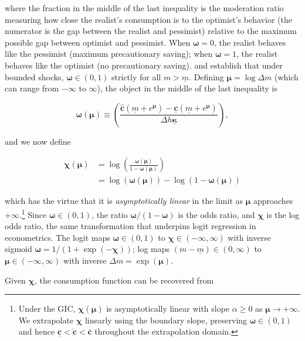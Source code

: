 \documentclass[preprint,authoryear]{elsarticle}
\newcommand{\mNrm}{m}
\newcommand{\hNrm}{h}
\newcommand{\cFunc}{\mathbf{c}}
\newcommand{\cFuncOpt}{\bar{\cFunc}}
\newcommand{\MPC}{\boldsymbol{\kappa}}
\newcommand{\MPCmin}{\underline{\MPC}}
\newcommand{\cFuncPes}{\underline{\cFunc}}
\newcommand{\mNrmMin}{\underline{\mNrm}}
\newcommand{\mNrmEx}{\Delta \mNrm}
\newcommand{\hNrmEx}{\Delta \hNrm}
\newcommand{\cFuncReal}{\hat{\cFunc}}
\newcommand{\modRte}{\boldsymbol{\omega}}
\newcommand{\logmNrmEx}{\boldsymbol{\mu}}
\newcommand{\logitModRte}{\boldsymbol{\chi}}
\newcommand{\asympSlope}{\alpha}
\newcommand{\cFuncApprox}{\grave{\cFunc}}
\begin{document}
where the fraction in the middle of the last inequality is the moderation ratio measuring how close the realist's consumption is to the optimist's behavior (the numerator is the gap between the realist and pessimist) relative to the maximum possible gap between optimist and pessimist. When $\modRte=0$, the realist behaves like the pessimist (maximum precautionary saving); when $\modRte=1$, the realist behaves like the optimist (no precautionary saving). \citet{CarrollKimball1996} and \citet{CarrollShanker2024} establish that under bounded shocks, $\modRte\in(0,1)$ strictly for all $\mNrm > \mNrmMin$. Defining $\logmNrmEx = \log \mNrmEx$ (which can range from $-\infty$ to $\infty$), the object in the middle of the last inequality is

\begin{equation}
\label{eq:modRte}
\modRte(\logmNrmEx) \equiv  \left(\frac{\cFuncReal(\mNrmMin+e^{\logmNrmEx})-\cFuncPes(\mNrmMin+e^{\logmNrmEx})}{\hNrmEx \MPCmin}\right),
\end{equation}

and we now define

\begin{equation}
\label{eq:chi}
\begin{aligned}
\logitModRte(\logmNrmEx) &= \log \left(\frac{\modRte(\logmNrmEx)}{1-\modRte(\logmNrmEx)}\right) \\
&= \log(\modRte(\logmNrmEx)) - \log(1-\modRte(\logmNrmEx))
\end{aligned}
\end{equation}

which has the virtue that it is \textit{asymptotically linear} in the limit as $\logmNrmEx$ approaches $+\infty$.\footnote{Under the GIC, $\logitModRte(\logmNrmEx)$ is asymptotically linear with slope $\asympSlope \geq 0$ as $\logmNrmEx \to +\infty$. We extrapolate $\logitModRte$ linearly using the boundary slope, preserving $\modRte\in(0,1)$ and hence $\cFuncPes < \cFuncApprox < \cFuncOpt$ throughout the extrapolation domain.} Since $\modRte \in (0,1)$, the ratio $\modRte/(1 -\modRte)$ is the odds ratio, and $\logitModRte$ is the log odds ratio, the same transformation that underpins logit regression in econometrics. The logit maps $\modRte \in (0,1)$ to $\logitModRte \in ( -\infty, \infty)$ with inverse sigmoid $\modRte = 1/(1+\exp( -\logitModRte))$; log maps $(\mNrm - \mNrmMin) \in (0, \infty)$ to $\logmNrmEx \in ( -\infty, \infty)$ with inverse $\mNrmEx = \exp(\logmNrmEx)$.

Given $\logitModRte$, the consumption function can be recovered from
\end{document}
